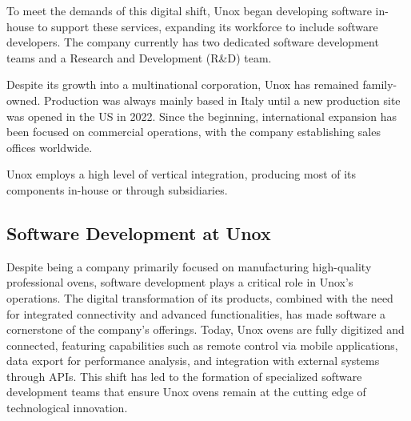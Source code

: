 To meet the demands of this digital shift, Unox began developing software in-house to support these services, expanding its workforce to include software developers. The company currently has two dedicated software development teams and a Research and Development (R\&D) team.

Despite its growth into a multinational corporation, Unox has remained family-owned. Production was always mainly based in Italy until a new production site was opened in the US in 2022. Since the beginning, international expansion has been focused on commercial operations, with the company establishing sales offices worldwide.

Unox employs a high level of vertical integration, producing most of its components in-house or through subsidiaries.

\subsection{Software Development at Unox}

Despite being a company primarily focused on manufacturing high-quality professional ovens, software development plays a critical role in Unox's operations. The digital transformation of its products, combined with the need for integrated connectivity and advanced functionalities, has made software a cornerstone of the company's offerings. Today, Unox ovens are fully digitized and connected, featuring capabilities such as remote control via mobile applications, data export for performance analysis, and integration with external systems through APIs. This shift has led to the formation of specialized software development teams that ensure Unox ovens remain at the cutting edge of technological innovation.

